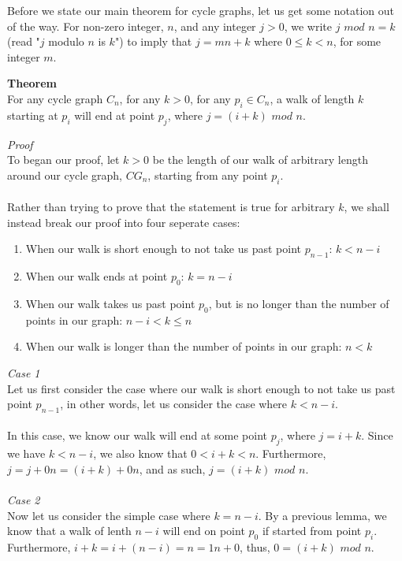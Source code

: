 \documentclass[a4paper,12pt]{article}
\begin{document}
Before we state our main theorem for cycle graphs, let us get some notation out of the way. For non-zero integer, $n$, and any integer $j > 0$, we write $j$ $mod$ $n = k$ (read "$j$ modulo $n$ is $k$") to imply that $j = mn + k$ where $0 \leq k < n$, for some integer $m$.\\
\begin{tcolorbox}
\textbf{Theorem}\\
For any cycle graph $C_n$, for any $k > 0$, for any $p_i \in C_n$, a walk of length $k$ starting at $p_i$ will end at point $p_j$, where $j = (i + k)$ $mod$ $n$.\\
\end{tcolorbox}
\noindent
\textit{Proof}\\
To began our proof, let $k > 0$ be the length of our walk of arbitrary length around our cycle graph, $CG_n$, starting from any point $p_i$.\\
\\
Rather than trying to prove that the statement is true for arbitrary $k$, we shall instead break our proof into four seperate cases:
\begin{enumerate}
\item When our walk is short enough to not take us past point $p_{n-1}$: $k < n -i$
\item When our walk ends at point $p_0$: $k = n - i$
\item When our walk takes us past point $p_0$, but is no longer than the number of points in our graph: $n - i < k \leq n$
\item When our walk is longer than the number of points in our graph: $n < k$
\end{enumerate}
\textit{Case 1}\\
Let us first consider the case where our walk is short enough to not take us past point $p_{n-1}$, in other words, let us consider the case where $k < n - i$.\\
\\
In this case, we know our walk will end at some point $p_j$, where $j = i + k$. Since we have $k < n - i$, we also know that $0 < i + k < n$. Furthermore, $j = j + 0n = (i + k) + 0n$, and as such, $j = (i + k)$ $mod$ $n$.\\
\\
\textit{Case 2}\\
Now let us consider the simple case where $k = n - i$. By a previous lemma, we know that a walk of lenth $n - i$ will end on point $p_0$ if started from point $p_i$. Furthermore, $i + k = i + (n - i) = n = 1n + 0$, thus, $0 = (i + k)$ $mod$ $n$.\\
\end{document}
